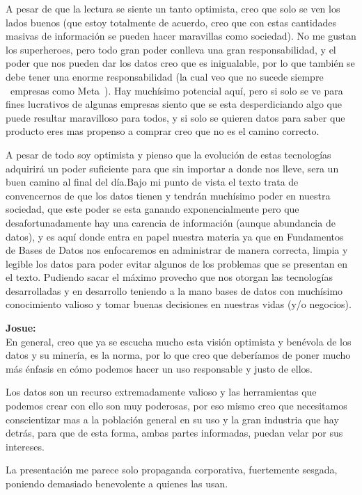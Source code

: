 \documentclass[12pt,a4paper]{article}
\begin{document}
\begin{enumerate}
\begin{enumerate}
				A pesar de que la lectura se siente un tanto optimista, creo que solo se ven los lados buenos (que estoy totalmente de 
				acuerdo, creo que con estas cantidades masivas de información se pueden hacer maravillas como sociedad).
				No me gustan los superheroes, pero todo gran poder conlleva una gran responsabilidad, y el poder que nos pueden dar los
				datos creo que es inigualable, por lo que también se debe tener una enorme responsabilidad (la cual veo que no sucede 
				siempre ~empresas como Meta~).
				Hay muchísimo potencial aquí, pero si solo se ve para fines lucrativos de algunas empresas siento que se esta 
				desperdiciando algo que puede resultar maravilloso para todos, y si solo se quieren datos para saber que producto eres mas
				propenso a comprar creo que no es el camino correcto.

				A pesar de todo soy optimista y pienso que la evolución de estas tecnologías adquirirá un poder suficiente para que sin
				importar a donde nos lleve, sera un buen camino al final del día.Bajo mi punto de vista el texto trata de convencernos de
				que los datos tienen y tendrán muchísimo poder en nuestra sociedad, que este poder se esta ganando exponencialmente pero 
				que desafortunadamente hay una carencia de información (aunque abundancia de datos), y es aquí donde entra en papel 
				nuestra materia ya que en Fundamentos de Bases de Datos nos enfocaremos en administrar de manera correcta, limpia y legible 
				los datos para poder evitar algunos de los problemas que se presentan en el texto. Pudiendo sacar el máximo provecho que 
				nos otorgan las tecnologías desarrolladas y en desarrollo teniendo a la mano bases de datos con muchísimo conocimiento 
				valioso y tomar buenas decisiones en nuestras vidas (y/o negocios).
				
				
				\textbf{Josue:}\\
				
				En general, creo que ya se escucha mucho esta visión optimista y benévola de los datos y su minería, es la norma, por lo que creo que deberíamos de poner mucho más énfasis en cómo podemos hacer un uso responsable y justo de ellos.

Los datos son un recurso extremadamente valioso y las herramientas que podemos crear con ello son muy poderosas, por eso mismo creo que necesitamos conscientizar mas a la población general en su uso y la gran industria que hay detrás, para que de esta forma, ambas partes informadas, puedan velar por sus intereses. 

La presentación me parece solo propaganda corporativa, fuertemente sesgada, poniendo demasiado benevolente a quienes las usan.



\end{enumerate}
\end{enumerate}
\end{document}
